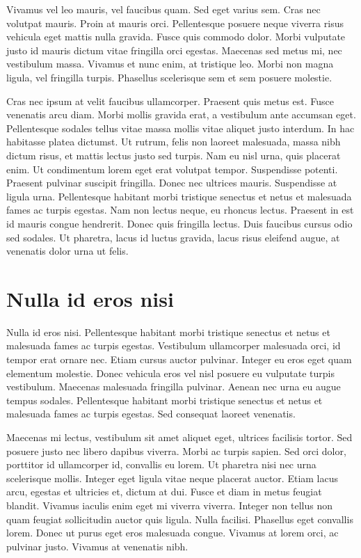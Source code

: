 Vivamus vel leo mauris, vel faucibus quam.
Sed eget varius sem.
Cras nec volutpat mauris.
Proin at mauris orci.
Pellentesque posuere neque viverra risus vehicula eget mattis nulla gravida.
Fusce quis commodo dolor.
Morbi vulputate justo id mauris dictum vitae fringilla orci egestas.
Maecenas sed metus mi, nec vestibulum massa.
Vivamus et nunc enim, at tristique leo.
Morbi non magna ligula, vel fringilla turpis.
Phasellus scelerisque sem et sem posuere molestie.

Cras nec ipsum at velit faucibus ullamcorper.
Praesent quis metus est.
Fusce venenatis arcu diam.
Morbi mollis gravida erat, a vestibulum ante accumsan eget.
Pellentesque sodales tellus vitae massa mollis vitae aliquet justo interdum.
In hac habitasse platea dictumst.
Ut rutrum, felis non laoreet malesuada, massa nibh dictum risus, et mattis lectus justo sed turpis.
Nam eu nisl urna, quis placerat enim.
Ut condimentum lorem eget erat volutpat tempor.
Suspendisse potenti.
Praesent pulvinar suscipit fringilla.
Donec nec ultrices mauris.
Suspendisse at ligula urna.
Pellentesque habitant morbi tristique senectus et netus et malesuada fames ac turpis egestas.
Nam non lectus neque, eu rhoncus lectus.
Praesent in est id mauris congue hendrerit.
Donec quis fringilla lectus.
Duis faucibus cursus odio sed sodales.
Ut pharetra, lacus id luctus gravida, lacus risus eleifend augue, at venenatis dolor urna ut felis.

\section{Nulla id eros nisi}
Nulla id eros nisi.
Pellentesque habitant morbi tristique senectus et netus et malesuada fames ac turpis egestas.
Vestibulum ullamcorper malesuada orci, id tempor erat ornare nec.
Etiam cursus auctor pulvinar.
Integer eu eros eget quam elementum molestie.
Donec vehicula eros vel nisl posuere eu vulputate turpis vestibulum.
Maecenas malesuada fringilla pulvinar.
Aenean nec urna eu augue tempus sodales.
Pellentesque habitant morbi tristique senectus et netus et malesuada fames ac turpis egestas.
Sed consequat laoreet venenatis.

Maecenas mi lectus, vestibulum sit amet aliquet eget, ultrices facilisis tortor.
Sed posuere justo nec libero dapibus viverra.
Morbi ac turpis sapien.
Sed orci dolor, porttitor id ullamcorper id, convallis eu lorem.
Ut pharetra nisi nec urna scelerisque mollis.
Integer eget ligula vitae neque placerat auctor.
Etiam lacus arcu, egestas et ultricies et, dictum at dui.
Fusce et diam in metus feugiat blandit.
Vivamus iaculis enim eget mi viverra viverra.
Integer non tellus non quam feugiat sollicitudin auctor quis ligula.
Nulla facilisi.
Phasellus eget convallis lorem.
Donec ut purus eget eros malesuada congue.
Vivamus at lorem orci, ac pulvinar justo.
Vivamus at venenatis nibh.

